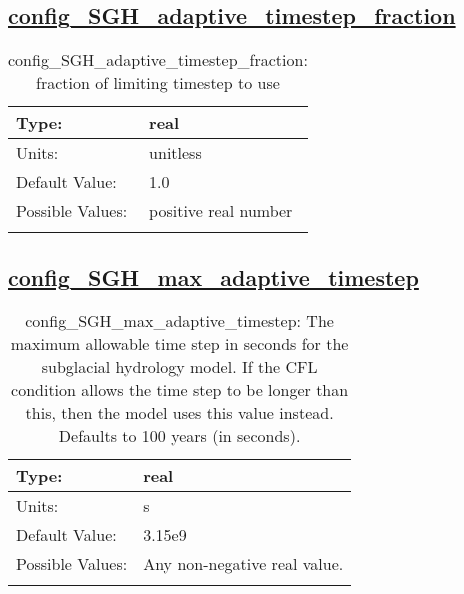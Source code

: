 \subsection[config\_SGH\_adaptive\_timestep\_fraction]{\hyperref[sec:nm_tab_subglacial_hydro]{config\_SGH\_adaptive\_timestep\_fraction}}
\label{subsec:nm_sec_config_SGH_adaptive_timestep_fraction}
\begin{center}
\begin{longtable}{| p{2.0in} || p{4.0in} |}
    \hline
    Type: & real \\
    \hline
    Units: & \si{unitless} \\
    \hline
    Default Value: & 1.0 \\
    \hline
    Possible Values: & positive real number \\
    \hline
    \caption{config\_SGH\_adaptive\_timestep\_fraction: fraction of limiting timestep to use}
\end{longtable}
\end{center}
\subsection[config\_SGH\_max\_adaptive\_timestep]{\hyperref[sec:nm_tab_subglacial_hydro]{config\_SGH\_max\_adaptive\_timestep}}
\label{subsec:nm_sec_config_SGH_max_adaptive_timestep}
\begin{center}
\begin{longtable}{| p{2.0in} || p{4.0in} |}
    \hline
    Type: & real \\
    \hline
    Units: & \si{s} \\
    \hline
    Default Value: & 3.15e9 \\
    \hline
    Possible Values: & Any non-negative real value. \\
    \hline
    \caption{config\_SGH\_max\_adaptive\_timestep: The maximum allowable time step in seconds for the subglacial hydrology model.  If the CFL condition allows the time step to be longer than this, then the model uses this value instead.  Defaults to 100 years (in seconds).}
\end{longtable}
\end{center}
